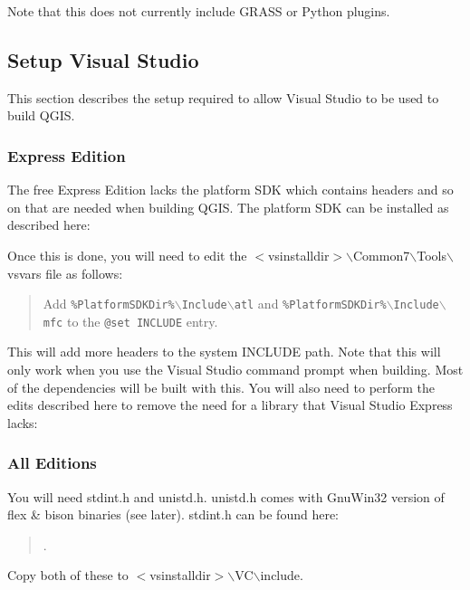 Note that this does not currently include GRASS or Python plugins.

\subsection{Setup Visual Studio}
This section describes the setup required to allow Visual Studio to be used to build QGIS. 

\subsubsection{Express Edition}
The free Express Edition lacks the platform SDK which contains headers and so on that are needed when building QGIS. The platform SDK can be installed as described here:

	\begin{quotation}
	\end{quotation}
Once this is done, you will need to edit the $<$vsinstalldir$>$$\backslash$Common7$\backslash$Tools$\backslash$vsvars file as follows:

	\begin{quotation}
Add \texttt{\%PlatformSDKDir\%$\backslash$Include$\backslash$atl} and \texttt{\%PlatformSDKDir\%$\backslash$Include$\backslash$mfc} to the \texttt{@set INCLUDE} entry.
	\end{quotation}
This will add more headers to the system INCLUDE path. Note that this will only work when you use the Visual Studio command prompt when building. Most of the dependencies will be built with this.
You will also need to perform the edits described here to remove the need for a library that Visual Studio Express lacks:

	\begin{quotation}
	\end{quotation}

\subsubsection{All Editions}
You will need stdint.h and unistd.h. unistd.h comes with GnuWin32 version of flex \& bison binaries (see later). stdint.h can be found here:

	\begin{quotation}
.
	\end{quotation}
Copy both of these to $<$vsinstalldir$>$$\backslash$VC$\backslash$include.


